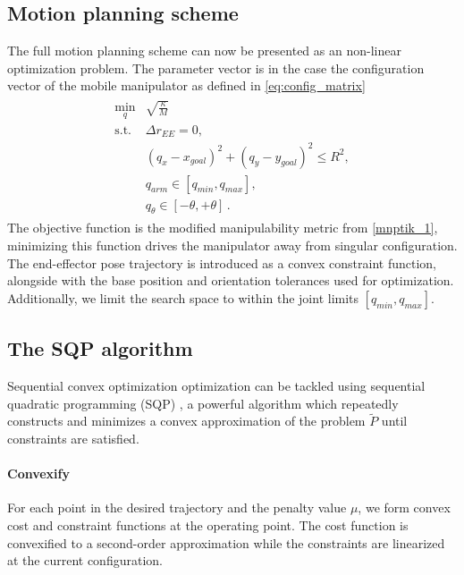 \documentclass[times, utf8, diplomski, english]{fer}
\begin{document}
\subsection{Motion planning scheme}
The full motion planning scheme can now be presented as an non-linear optimization problem. 
The parameter vector is in the case the configuration vector of the mobile manipulator as defined in \eqref{eq:config_matrix}
\begin{align}
\begin{array}{rl}
\label{mnptik_2}
\min\limits_{q} &  \sqrt{\frac{\kappa}{M}}\\
\mbox{s.t.} & \Delta r_{EE} = 0, \\ 
& \left(q_{x} - x_{goal}\right)^2 + \left(q_{y} - y_{goal}\right)^2 \le R^2 , \\
& q_{arm} \in \left[q_{min}, q_{max}\right] , \\
& q_{\theta} \in \left[-\theta , +\theta \right]\, .
\end{array}
\end{align}
The objective function is the modified manipulability metric from \eqref{mnptik_1}, minimizing this function drives the manipulator away from singular configuration.
The end-effector pose trajectory is introduced as a convex constraint function, alongside with the base position and orientation tolerances used for optimization.
Additionally, we limit the search space to within the joint limits $[q_{min}, q_{max}]$.
\subsection{The SQP algorithm}
Sequential convex optimization optimization can be tackled using sequential quadratic programming (SQP) \citep{schulman2013finding, xu2010two}, a powerful algorithm which repeatedly constructs and minimizes a convex approximation of the problem $\tilde{P}$ until constraints are satisfied.
\paragraph*{Convexify}
For each point in the desired trajectory and the penalty value $\mu$, we form convex cost and constraint functions at the operating point.
The cost function is convexified to a second-order approximation while the constraints are linearized at the current configuration.
\end{document}
